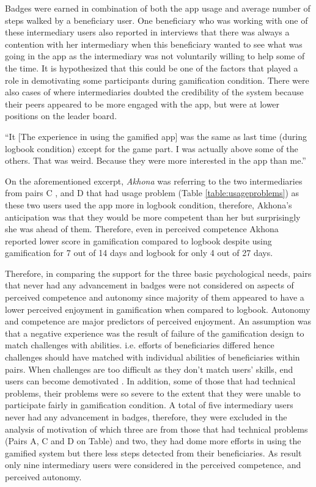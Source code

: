 Badges were earned in combination of both the app usage and average number of steps walked by a beneficiary user. One beneficiary who was working with one of these intermediary users also reported in interviews that there was always a contention with her intermediary when this beneficiary wanted to see what was going in the app as the intermediary was not voluntarily willing to help some of the time. It is hypothesized that this could be one of the factors that played a role in demotivating some participants during gamification condition. There were also cases of  where intermediaries doubted the credibility of the system because their peers appeared to be more engaged with the app, but were at lower positions on the leader board. 

 {``It [The experience in using the gamified app] was the same as last time (during logbook condition) except for the game part. I was actually above some of the others. That was weird. Because they were more interested in the app than me.''} 

On the aforementioned excerpt, \emph{Akhona} was referring to the two intermediaries from pairs C , and D that had usage problem (Table \ref{table:usageproblems}) as these two users used the app more in logbook condition, therefore, Akhona's anticipation was that they would be more competent than her but surprisingly she was ahead of them.  Therefore, even in perceived competence Akhona reported lower score in gamification compared to logbook despite using gamification for 7 out of 14 days and logbook for only 4 out of 27 days.

Therefore, in comparing the support for the three basic psychological needs, pairs that never had any advancement in badges were not considered on aspects of perceived competence and autonomy since majority of them appeared to have a lower perceived enjoyment in gamification when compared to logbook. Autonomy and competence are major predictors of perceived enjoyment. An assumption was that a negative experience was the result of failure of the gamification design to match challenges with abilities. i.e. efforts of beneficiaries differed hence challenges should have matched with individual abilities of beneficiaries within pairs. When challenges are too difficult as they don't match users' skills, end users can become demotivated \citep{zhang2008motivational}. In addition, some of those that had technical problems, their problems were so severe to the extent that they were unable to participate fairly in gamification condition. A total of five intermediary users never had any advancement in badges, therefore, they were excluded in the analysis of motivation of which three are from those that had technical problems (Pairs A, C and D on Table) and two, they had dome more efforts in using the gamified system but there less steps detected from their beneficiaries. As result only nine intermediary users were considered in the perceived competence, and perceived autonomy.

